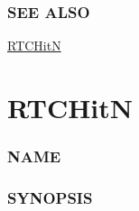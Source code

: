 \subsubsection{SEE ALSO}\label{see-also}

\hyperref[rtchitn]{RTCHitN}

\pagebreak

\section{RTCHitN}\label{rtchitn}

\subsubsection{NAME}\label{name}

\begin{Shaded}
\begin{Highlighting}[]
\OperatorTok{{-}}
\end{Highlighting}
\end{Shaded}

\subsubsection{SYNOPSIS}\label{synopsis}


